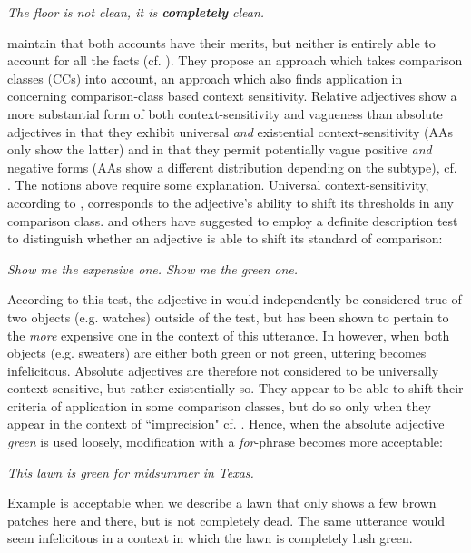 \documentclass[output=paper]{langsci/langscibook}
\begin{document}
\ea\label{ex:harris:5}
	\itshape The floor is not clean, it is \textbf{completely} clean.
\z

\citet*{Toledo2011} maintain that both accounts have their merits, but neither is entirely able to account for all the facts (cf. \citealt[140]{Toledo2011}). They propose an approach which takes comparison classes (CCs) into account, an approach which also finds application in \citet{Burnett2017} concerning comparison-class based context sensitivity.
Relative adjectives show a more substantial form of both context-sensitivity and vagueness than absolute adjectives in that they exhibit universal \textit{and} existential context-sensitivity (AAs only show the latter) and in that they permit potentially vague positive \textit{and} negative forms (AAs show a different distribution depending on the subtype), cf. \citet{Burnett2017}. The notions above require some explanation. Universal context-sensitivity, according to \textcite[41]{Burnett2017}, corresponds to the adjective's ability to shift its thresholds in any comparison class. \textcite[28]{Kennedy2007} and others have suggested to employ a definite description test to distinguish whether an adjective is able to shift its standard of comparison:

\ea\label{ex:harris:6}
	\itshape Show me the expensive one.
\ex\label{ex:harris:7}
	\itshape Show me the green one.
\z

According to this test, the adjective in  would independently be considered true of two objects (e.g. watches) outside of the test, but has been shown to pertain to the \textit{more} expensive one in the context of this utterance. In  however, when both objects (e.g. sweaters) are either both green or not green, uttering  becomes infelicitous. Absolute adjectives are therefore not considered to be universally context-sensitive, but rather existentially so. They appear to be able to shift their criteria of application in some comparison classes, but do so only when they appear in the context of ``imprecision" cf. \textcite[42]{Burnett2017}. Hence, when the absolute adjective \textit{green} is used loosely, modification with a \textit{for}-phrase becomes more acceptable:

\ea \label{ex:harris:8}
	\itshape This lawn is green for midsummer in Texas.
\z

Example  is acceptable when we describe a lawn that only shows a few brown patches here and there, but is not completely dead. The same utterance would seem infelicitous in a context in which the lawn is completely lush green.
\end{document}
